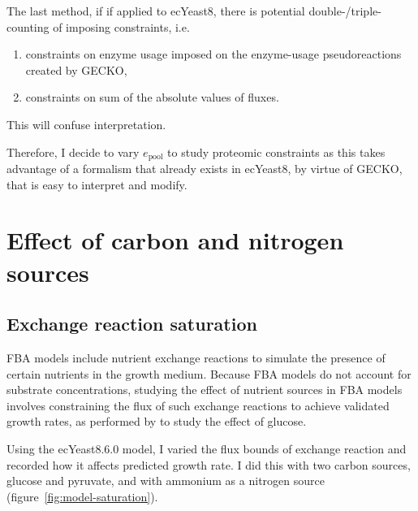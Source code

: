The last method, if if applied to ecYeast8,
there is potential double-/triple-counting of imposing constraints, i.e.\:
\begin{enumerate}
  \item constraints on enzyme usage imposed on the enzyme-usage pseudoreactions created by GECKO,
  \item constraints on sum of the absolute values of fluxes.
\end{enumerate}
This will confuse interpretation.

Therefore, I decide to vary $e_{\mathrm{pool}}$ to study proteomic constraints as this takes advantage of a formalism that already exists in ecYeast8, by virtue of GECKO, that is easy to interpret and modify.


\section{Effect of carbon and nitrogen sources}
\label{sec:model-exchange}

\subsection{Exchange reaction saturation}
\label{subsec:model-saturation}

FBA models include nutrient exchange reactions to simulate the presence of certain nutrients in the growth medium.
Because FBA models do not account for substrate concentrations, studying the effect of nutrient sources in FBA models involves constraining the flux of such exchange reactions to achieve validated growth rates, as performed by \textcite{elsemmanWholecellModelingYeast2022} to study the effect of glucose.

Using the ecYeast8.6.0 model, I varied the flux bounds of exchange reaction and recorded how it affects predicted growth rate.
I did this with two carbon sources, glucose and pyruvate, and with ammonium as a nitrogen source (figure~\ref{fig:model-saturation}).

